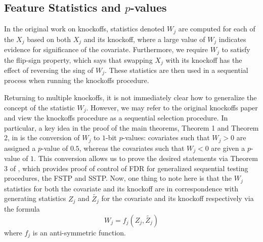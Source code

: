 \documentclass[12pt,reqno]{amsart}
\numberwithin{equation}{section}
\begin{document}
\subsection{Feature Statistics and \texorpdfstring{$p$}{p}-values}
In the original work on knockoffs, statistics denoted $W_j$ are computed for each of the $X_j$ based on both $X_j$ and its knockoff, where a large value of $W_j$ indicates evidence for significance of the covariate. Furthermore, we require $W_j$ to satisfy the flip-sign property, which says that swapping $X_j$ with its knockoff has the effect of reversing the sing of $W_j$. These statistics are then used in a sequential process when running the knockoffs procedure.

Returning to multiple knockoffs, it is not immediately clear how to generalize the concept of the statistic $W_j$. However, we may refer to the original knockoffs paper \cite{knockoffs} and view the knockoffs procedure as a sequential selection procedure. In particular, a key idea in the proof of the main theorems, Theorem 1 and Theorem 2, in \cite{knockoffs} is the conversion of $W_j$ to $1$-bit $p$-values: covariates such that $W_j > 0$ are assigned a $p$-value of $0.5$, whereas the covariates such that $W_j < 0$ are given a $p$-value of $1$. This conversion allows us to prove the desired statements via Theorem 3 of \cite{knockoffs}, which provides proof of control of FDR for generalized sequential testing procedures, the FSTP and SSTP. Now, one thing to note here is that the $W_j$ statistics for both the covariate and its knockoff are in correspondence with generating statistics $Z_j$ and $\tilde{Z_j}$ for the covariate and its knockoff respectively via the formula
\begin{equation}
W_j = f_j(Z_j, \tilde{Z_j})
\end{equation}
where $f_j$ is an anti-symmetric function. 
\end{document}
